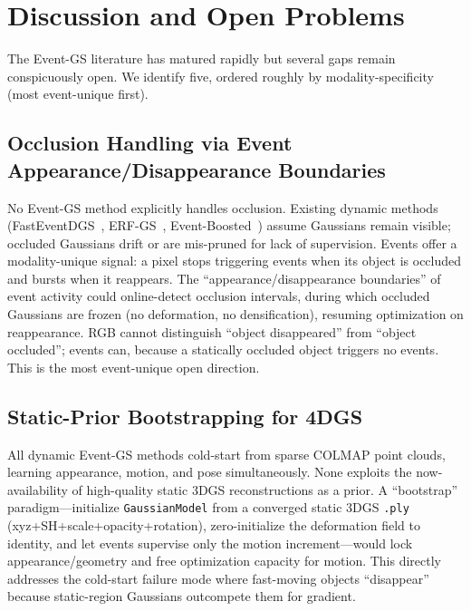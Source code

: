 \section{Discussion and Open Problems}
\label{sec:discussion}

The Event-GS literature has matured rapidly but several gaps remain conspicuously open. We identify five, ordered roughly by modality-specificity (most event-unique first).

\subsection{Occlusion Handling via Event Appearance/Disappearance Boundaries}
\label{sec:disc:occlusion}

No Event-GS method explicitly handles occlusion. Existing dynamic methods (FastEventDGS~\cite{dai2026fasteventdgs}, ERF-GS~\cite{bai2026erfgs}, Event-Boosted~\cite{xu2025eventboosted}) assume Gaussians remain visible; occluded Gaussians drift or are mis-pruned for lack of supervision. Events offer a modality-unique signal: a pixel stops triggering events when its object is occluded and bursts when it reappears. The ``appearance/disappearance boundaries'' of event activity could online-detect occlusion intervals, during which occluded Gaussians are frozen (no deformation, no densification), resuming optimization on reappearance. RGB cannot distinguish ``object disappeared'' from ``object occluded''; events can, because a statically occluded object triggers no events. This is the most event-unique open direction.

\subsection{Static-Prior Bootstrapping for 4DGS}
\label{sec:disc:bootstrap}

All dynamic Event-GS methods cold-start from sparse COLMAP point clouds, learning appearance, motion, and pose simultaneously. None exploits the now-availability of high-quality static 3DGS reconstructions as a prior. A ``bootstrap'' paradigm---initialize \texttt{GaussianModel} from a converged static 3DGS \texttt{.ply} (xyz+SH+scale+opacity+rotation), zero-initialize the deformation field to identity, and let events supervise only the motion increment---would lock appearance/geometry and free optimization capacity for motion. This directly addresses the cold-start failure mode where fast-moving objects ``disappear'' because static-region Gaussians outcompete them for gradient.

